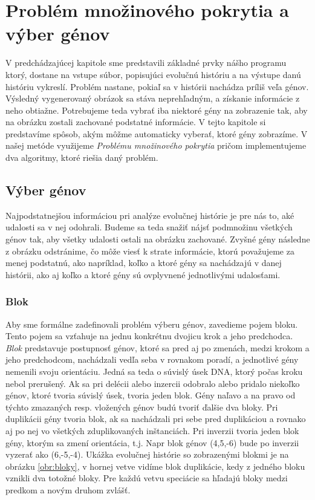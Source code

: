 \chapter{Problém množinového pokrytia a výber génov}
\label{chap:setcover}
V predchádzajúcej kapitole sme predstavili základné prvky nášho programu ktorý, dostane na vstupe súbor, 
popisujúci evolučnú históriu a na výstupe danú históriu vykreslí.
Problém nastane, pokiaľ sa v histórii nachádza príliš veľa génov. Výsledný vygenerovaný obrázok sa stáva neprehľadným, 
a získanie informácie z neho obtiažne. 
Potrebujeme teda vybrať iba niektoré gény na zobrazenie tak, aby na obrázku zostali zachované podstatné informácie.
V tejto kapitole si predstavíme spôsob, akým môžme automaticky vyberať, ktoré gény zobrazíme.
V našej metóde využijeme \emph{Problému množinového pokrytia} pričom implementujeme dva algoritmy, ktoré riešia daný problém.
\section{Výber génov}
Najpodstatnejšou informáciou pri analýze evolučnej histórie je pre nás to, aké udalosti sa v nej odohrali. 
Budeme sa teda snažiť nájsť podmnožinu všetkých génov tak, aby všetky udalosti ostali na obrázku zachované.
Zvyšné gény následne z obrázku odstránime, čo môže viesť k strate informácie, ktorú považujeme za menej podstatnú, 
ako napríklad, koľko a ktoré gény sa nachádzajú v danej histórii, ako aj koľko a ktoré gény sú ovplyvnené jednotlivými udalosťami.
\subsection{Blok}\label{blok}
Aby sme formálne zadefinovali problém výberu génov, zavedieme pojem bloku. Tento pojem sa vzťahuje na jednu konkrétnu dvojicu krok a jeho predchodca.
\emph{Blok} predstavuje postupnosť génov, ktoré sa pred aj po zmenách, medzi krokom a jeho predchodcom, nachádzali vedľa seba v rovnakom poradí, a jednotlivé gény nemenili
svoju orientáciu. Jedná sa teda o súvislý
úsek DNA, ktorý počas kroku nebol prerušený.
Ak sa pri delécii alebo inzercii odobralo alebo pridalo niekoľko génov, ktoré tvoria súvislý úsek, tvoria jeden blok. 
Gény naľavo a na pravo od týchto zmazaných resp. vložených génov budú tvoriť ďalšie dva bloky.
Pri duplikácii gény tvoria blok, ak sa nachádzali pri sebe pred duplikáciou a rovnako aj po nej vo všetkých zduplikovaných inštanciách.
Pri inverzii tvoria jeden blok gény, ktorým sa zmení orientácia, t.j. Napr blok génov (4,5,-6) bude po inverzii vyzerať ako (6,-5,-4).
Ukážka evolučnej histórie so zobrazenými blokmi je na obrázku \ref{obr:bloky},
v hornej vetve vidíme blok duplikácie, kedy z jedného bloku vznikli dva totožné bloky.
Pre každú vetvu speciácie sa hľadajú bloky medzi predkom a novým druhom zvlášť.

